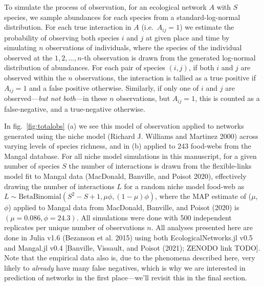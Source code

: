 \documentclass[11pt]{article}
\begin{document}
To simulate the process of observation, for an ecological network \(A\)
with \(S\) species, we sample abundances for each species from a
standard-log-normal distribution. For each true interaction in \(A\)
(i.e.~\(A_{ij} = 1\)) we estimate the probability of observing both
species \(i\) and \(j\) at given place and time by simulating \(n\)
observations of individuals, where the species of the individual
observed at the \(1,2,\dots,n\)-th observation is drawn from the
generated log-normal distribution of abundances. For each pair of
species \((i,j)\), if both \(i\) and \(j\) are observed within the \(n\)
observations, the interaction is tallied as a true positive if
\(A_{ij}=1\) and a false positive otherwise. Similarly, if only one of
\(i\) and \(j\) are observed---\emph{but not both}---in these \(n\)
observations, but \(A_{ij}=1\), this is counted as a false-negative, and
a true-negative otherwise.

In fig.~\ref{fig:totalobs} (a) we see this model of observation applied
to networks generated using the niche model (Richard J. Williams and
Martinez 2000) across varying levels of species richness, and in (b)
applied to 243 food-webs from the Mangal database. For all niche model
simulations in this manuscript, for a given number of species \(S\) the
number of interactions is drawn from the flexible-links model fit to
Mangal data (MacDonald, Banville, and Poisot 2020), effectively drawing
the number of interactions \(L\) for a random niche model food-web as
\(L \sim \text{BetaBinomial}(S^2-S+1, \mu \phi, (1-\mu)\phi)\), where
the MAP estimate of (\(\mu\), \(\phi\)) applied to Mangal data from
MacDonald, Banville, and Poisot (2020) is \((\mu = 0.086, \phi =24.3)\).
All simulations were done with 500 independent replicates per unique
number of observations \(n\). All analyses presented here are done in
Julia v1.6 (Bezanson et al. 2015) using both EcologicalNetworks.jl v0.5
and Mangal.jl v0.4 {[}Banville, Vissault, and Poisot (2021); ZENODO link
TODO{]}. Note that the empirical data also is, due to the phenomena
described here, very likely to \emph{already} have many false negatives,
which is why we are interested in prediction of networks in the first
place---we'll revisit this in the final section.
\end{document}

